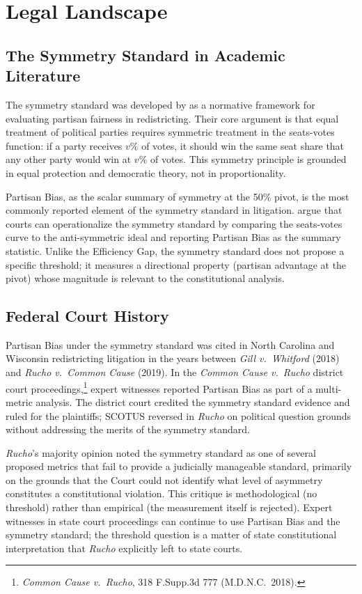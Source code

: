 \section{Legal Landscape}
\label{sec:legal}

\subsection{The Symmetry Standard in Academic Literature}

The symmetry standard was developed by \citet{gelmanKing1994} as a normative
framework for evaluating partisan fairness in redistricting. Their core argument
is that equal treatment of political parties requires symmetric treatment in the
seats-votes function: if a party receives $v\%$ of votes, it should win the same
seat share that any other party would win at $v\%$ of votes. This symmetry principle
is grounded in equal protection and democratic theory, not in proportionality.

Partisan Bias, as the scalar summary of symmetry at the 50\% pivot, is the most
commonly reported element of the symmetry standard in litigation. \citet{gelmanKing1994}
argue that courts can operationalize the symmetry standard by comparing the seats-votes
curve to the anti-symmetric ideal and reporting Partisan Bias as the summary statistic.
Unlike the Efficiency Gap, the symmetry standard does not propose a specific threshold;
it measures a directional property (partisan advantage at the pivot) whose magnitude
is relevant to the constitutional analysis.

\subsection{Federal Court History}

Partisan Bias under the symmetry standard was cited in North Carolina and Wisconsin
redistricting litigation in the years between \textit{Gill v.\ Whitford} (2018)
and \textit{Rucho v.\ Common Cause} (2019). In the \textit{Common Cause v.\ Rucho}
district court proceedings,\footnote{\textit{Common Cause v.\ Rucho}, 318 F.Supp.3d
777 (M.D.N.C.\ 2018).} expert witnesses reported Partisan Bias as part of a
multi-metric analysis. The district court credited the symmetry standard evidence
and ruled for the plaintiffs; SCOTUS reversed in \textit{Rucho} on political
question grounds without addressing the merits of the symmetry standard.

\textit{Rucho}'s majority opinion noted the symmetry standard as one of several
proposed metrics that fail to provide a judicially manageable standard, primarily
on the grounds that the Court could not identify what level of asymmetry constitutes
a constitutional violation. This critique is methodological (no threshold) rather
than empirical (the measurement itself is rejected). Expert witnesses in state
court proceedings can continue to use Partisan Bias and the symmetry standard;
the threshold question is a matter of state constitutional interpretation that
\textit{Rucho} explicitly left to state courts.

